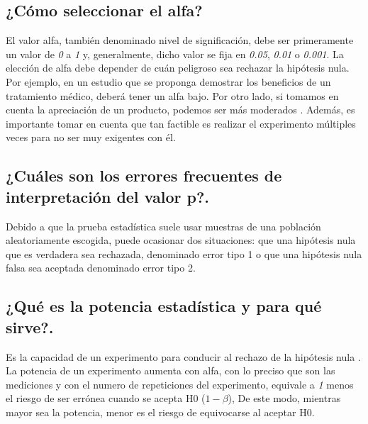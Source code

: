 \documentclass[]{article}
\begin{document}
\subsection{¿Cómo seleccionar el alfa?}
El valor alfa, también denominado nivel de significación, debe ser primeramente un valor de \textit{0} a \textit{1} y, generalmente, dicho valor se fija en \textit{0.05}, \textit{0.01} o \textit{0.001}.
La elección de alfa debe depender de cuán peligroso sea rechazar la hipótesis nula. Por ejemplo, en un estudio que se proponga demostrar los beneficios de un tratamiento médico, deberá tener un alfa bajo. Por otro lado, si tomamos en cuenta la apreciación de un producto, podemos ser más moderados \cite{Articulo_1}. Además, es importante tomar en cuenta que tan factible es realizar el experimento múltiples veces para no ser muy exigentes con él.

\subsection{¿Cuáles son los errores frecuentes de interpretación del valor p?.}
Debido a que la prueba estadística suele usar muestras de una población aleatoriamente escogida, puede ocasionar dos situaciones: que una hipótesis nula que es verdadera sea rechazada, denominado error tipo 1 o que una hipótesis nula falsa sea aceptada denominado error tipo 2.

\subsection{¿Qué es la potencia estadística y para qué sirve?.}
Es la capacidad de un experimento para conducir al rechazo de la hipótesis nula \cite{Articulo_1}. La potencia de un experimento aumenta con alfa, con lo preciso que son las mediciones y con el numero de repeticiones del experimento, equivale a \textit{1} menos el riesgo de ser errónea cuando se acepta H0 (\textit{$1 - \beta $}), De este modo, mientras mayor sea la potencia, menor es el riesgo de equivocarse al aceptar H0.
\end{document}

